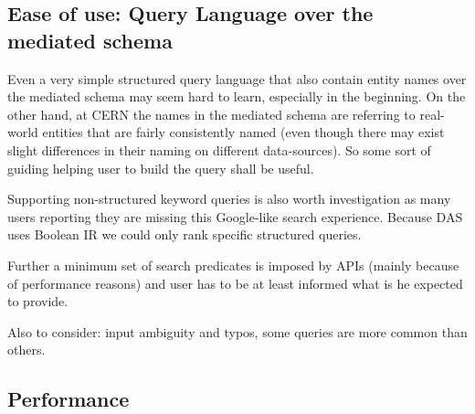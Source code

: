\documentclass[a4paper,11pt,draft]{article}
\begin{document}
\subsection{Ease of use: Query Language over the mediated schema}
	Even a very simple structured query language that also contain entity names over the mediated schema may seem {\color{red}hard} to learn, especially in the beginning.
   On the other hand, at CERN the names in  the mediated schema are referring to real-world entities that {\color{red}are fairly consistently named} (even though there may exist slight differences in their naming on different data-sources). 
   So some sort of guiding helping user to build the query shall be useful. 
   
   Supporting non-structured keyword queries is also worth investigation as many users reporting they are missing this Google-like search experience. {\color{red}Because DAS uses Boolean IR we could only rank specific structured queries.}
        
	Further a minimum set of search predicates is imposed by APIs (mainly because of performance reasons) and user has to be at least informed what is he expected to provide.
                
                
Also to consider: input ambiguity and typos, some queries are more common than others.

\subsection{Performance}
\end{document}
